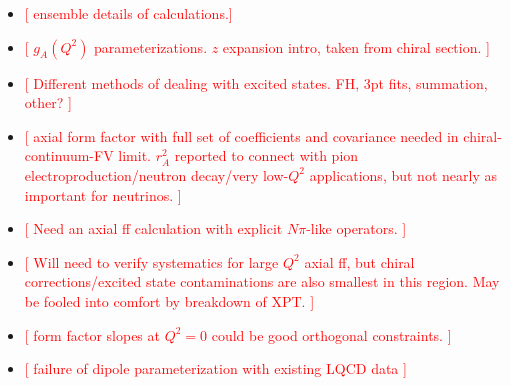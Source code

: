 \begin{itemize}
\item
\textcolor{red}{[ ensemble details of calculations.]}
\item
\textcolor{red}{[
 $g_A(Q^2)$ parameterizations.
 $z$ expansion intro, taken from chiral section.
]}
\item
\textcolor{red}{[
 Different methods of dealing with excited states.
 FH, 3pt fits, summation, other?
]}
\item
\textcolor{red}{[
 axial form factor with full set of coefficients and covariance needed
 in chiral-continuum-FV limit.
 $r_A^2$ reported to connect with pion electroproduction/neutron decay/very low-$Q^2$ applications,
 but not nearly as important for neutrinos.
]}
\item
\textcolor{red}{[ Need an axial ff calculation with explicit $N\pi$-like operators. ]}
\item
\textcolor{red}{[ Will need to verify systematics for large $Q^2$ axial ff,
 but chiral corrections/excited state contaminations are also smallest in this region.
 May be fooled into comfort by breakdown of XPT.
]}
\item
\textcolor{red}{[ form factor slopes at $Q^2=0$ could be good orthogonal constraints.  ]}
\item
\textcolor{red}{[ failure of dipole parameterization with existing LQCD data ]}
\end{itemize}

